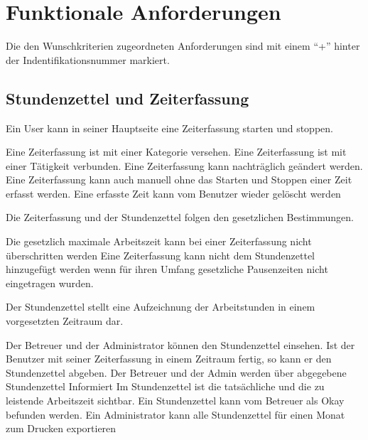 \section{Funktionale Anforderungen}

Die den Wunschkriterien zugeordneten Anforderungen sind mit einem "`+"' hinter der Indentifikationsnummer markiert.

\subsection{Stundenzettel und Zeiterfassung}

\begin{requirements}
    Ein User kann in seiner Hauptseite eine Zeiterfassung starten und stoppen.
    \begin{requirements}
         Eine Zeiterfassung ist mit einer Kategorie versehen.
         Eine Zeiterfassung ist mit einer Tätigkeit verbunden.
         Eine Zeiterfassung kann nachträglich geändert werden.
         Eine Zeiterfassung kann auch manuell ohne das Starten und Stoppen einer Zeit erfasst werden.
         Eine erfasste Zeit kann vom Benutzer wieder gelöscht werden
    \end{requirements}

    Die Zeiterfassung und der Stundenzettel folgen den gesetzlichen Bestimmungen.
    \begin{requirements}
         Die gesetzlich maximale Arbeitszeit kann bei einer Zeiterfassung nicht überschritten werden
         Eine Zeiterfassung kann nicht dem Stundenzettel hinzugefügt werden wenn für ihren Umfang gesetzliche Pausenzeiten nicht eingetragen wurden.
    \end{requirements}

    Der Stundenzettel stellt eine Aufzeichnung der Arbeitstunden in einem vorgesetzten Zeitraum dar.
    \begin{requirements}
         Der Betreuer und der Administrator können den Stundenzettel einsehen.
         Ist der Benutzer mit seiner Zeiterfassung in einem Zeitraum fertig, so kann er den Stundenzettel abgeben.
         Der Betreuer und der Admin werden über abgegebene Stundenzettel Informiert
         Im Stundenzettel ist die tatsächliche und die zu leistende Arbeitszeit sichtbar.
         Ein Stundenzettel kann vom Betreuer als Okay befunden werden.
         Ein Administrator kann alle Stundenzettel für einen Monat zum Drucken exportieren
    \end{requirements}

\end{requirements}

